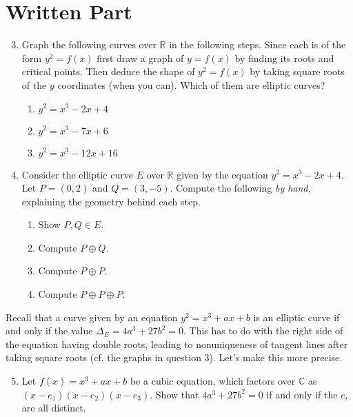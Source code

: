 \documentclass[11pt]{article}
\begin{document}
\section*{Written Part}
\begin{enumerate}
\setcounter{enumi}{2}
  \item{
  Graph the following curves over $\mathbb{R}$ in the following steps. Since each is of the form $y^2=f(x)$ first draw a graph of $y = f(x)$ by finding its roots and critical points.  Then deduce the shape of $y^2 = f(x)$ by taking square roots of the $y$ coordinates (when you can).  Which of them are elliptic curves?
  \begin{enumerate}
  \item $y^2 = x^3 -2x+4$
  \item $y^2 = x^3 - 7x + 6$
  \item $y^2 = x^3 - 12x + 16$
  \end{enumerate}
  }
\item{
Consider the elliptic curve $E$ over $\mathbb{R}$ given by the equation $y^2 = x^3 - 2x + 4$.  Let $P = (0,2)$ and $Q = (3,-5)$.  Compute the following \textit{by hand}, explaining the geometry behind each step. 
  \begin{enumerate}
    \item{
    Show $P,Q\in E$.
    }
    \item{
    Compute $P\oplus Q$.
    }
    \item{
    Compute $P\oplus P$.
    }
    \item{
    Compute $P\oplus P\oplus P$.
    }
  \end{enumerate}
  }
\end{enumerate}
Recall that a curve given by an equation $y^2 = x^3 + ax + b$ is an elliptic curve if and only if the value $\Delta_E = 4a^3 + 27b^2=0$.   This has to do with the right side of the equation having double roots, leading to nonuniqueness of tangent lines after taking square roots (cf. the graphs in question 3).  Let's make this more precise.
\begin{enumerate}
\setcounter{enumi}{4}
  \item{
  Let $f(x) = x^3 + ax + b$ be a cubic equation, which factors over $\mathbb{C}$ as $(x-e_1)(x-e_2)(x-e_3)$.  Show that $4a^3 + 27b^2 = 0$ if and only if the $e_i$ are all distinct.}
  
  \end{enumerate}
\end{document}
